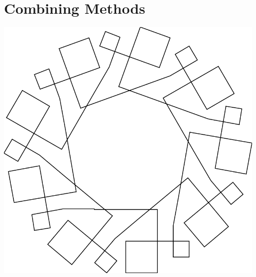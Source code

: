 \documentclass[a4paper,10pt,twoside]{book}
\begin{document}
    \sloppy
\fi

\chapter{Combining Methods}\label{cha:combiningMethods}


% 
% 
% 


\includegraphics[width=0.45\linewidth]{compArtNouveauTurningScr}
\vspace*{1cm}
\end{document}
